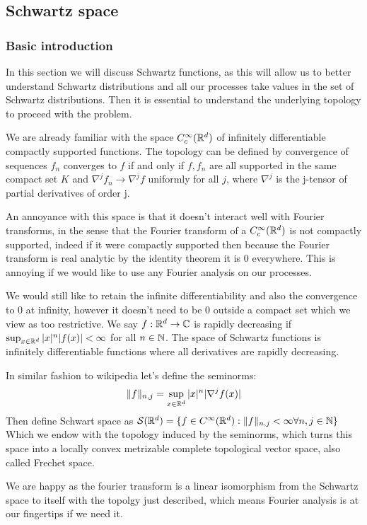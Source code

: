 \documentclass[../main.tex]{subfiles}
\begin{document}
\subsection{Schwartz space}
\subsubsection{Basic introduction}
In this section we will discuss Schwartz functions, as this will allow us to better understand Schwartz distributions and all our processes take values in the set of Schwartz distributions.
Then it is essential to understand the underlying topology to proceed with the problem.

We are already familiar with the space $C_c^\infty(\mathbb{R}^d)$ of infinitely differentiable compactly supported functions. The topology can be defined by convergence of sequences $f_n$ converges to $f$ if and only if $f,f_n$ are all supported in the same compact set $K$ and $\nabla^jf_n\rightarrow\nabla^jf$ uniformly for all $j$, where $\nabla^j$ is the j-tensor of partial derivatives of order j.

An annoyance with this space is that it doesn't interact well with Fourier transforms, in the sense that the Fourier transform of a $C_c^\infty(\mathbb{R}^d)$ is not compactly supported, indeed if it were compactly supported then because the Fourier transform is real analytic by the identity theorem it is 0 everywhere. This is annoying if we would like to use any Fourier analysis on our processes.

We would still like to retain the infinite differentiability and also the convergence to $0$ at infinity, however it doesn't need to be $0$ outside a compact set which we view as too restrictive.
We say $f:\mathbb{R}^d\rightarrow\mathbb{C}$ is rapidly decreasing if $\sup_{x\in\mathbb{R}^d}|x|^n|f(x)|<\infty$ for all $n\in{\mathbb N}$. The space of Schwartz functions is infinitely differentiable functions where all derivatives are rapidly decreasing.

In similar fashion to wikipedia let's define the seminorms:
\begin{equation}
    \lVert f\rVert_{n,j}=\sup_{x\in\mathbb{R}^d}|x|^n|\nabla^jf(x)|
\end{equation}
Then define Schwart space as ${\mathcal S}(\mathbb{R}^d)=\{f\in C^\infty(\mathbb{R}^d):\lVert f\rVert_{n,j}<\infty\forall n,j\in{\mathbb N}\}$
Which we endow with the topology induced by the seminorms, which turns this space into a locally convex metrizable complete topological vector space, also called Frechet space. 

We are happy as the fourier transform is a linear isomorphism from the Schwartz space to itself with the topolgy just described, which means Fourier analysis is at our fingertips if we need it.
\end{document}
